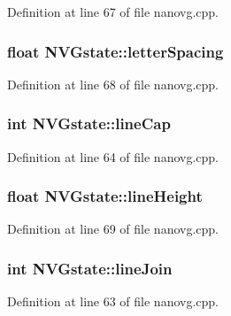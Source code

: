 Definition at line 67 of file nanovg.\+cpp.

\hypertarget{struct_n_v_gstate_a4c83b231e88c9a45c3c53a1ff4022f02}{
\subsubsection[{letter\+Spacing}]{\setlength{\rightskip}{0pt plus 5cm}float N\+V\+Gstate\+::letter\+Spacing}}\label{struct_n_v_gstate_a4c83b231e88c9a45c3c53a1ff4022f02}


Definition at line 68 of file nanovg.\+cpp.

\hypertarget{struct_n_v_gstate_ad1767dce784dc325d7e16364ce92c8ec}{
\subsubsection[{line\+Cap}]{\setlength{\rightskip}{0pt plus 5cm}int N\+V\+Gstate\+::line\+Cap}}\label{struct_n_v_gstate_ad1767dce784dc325d7e16364ce92c8ec}


Definition at line 64 of file nanovg.\+cpp.

\hypertarget{struct_n_v_gstate_a456105152dc65acf8888734de0cb6195}{
\subsubsection[{line\+Height}]{\setlength{\rightskip}{0pt plus 5cm}float N\+V\+Gstate\+::line\+Height}}\label{struct_n_v_gstate_a456105152dc65acf8888734de0cb6195}


Definition at line 69 of file nanovg.\+cpp.

\hypertarget{struct_n_v_gstate_a5aa107c0177e88030124c63b306b6d01}{
\subsubsection[{line\+Join}]{\setlength{\rightskip}{0pt plus 5cm}int N\+V\+Gstate\+::line\+Join}}\label{struct_n_v_gstate_a5aa107c0177e88030124c63b306b6d01}


Definition at line 63 of file nanovg.\+cpp.

